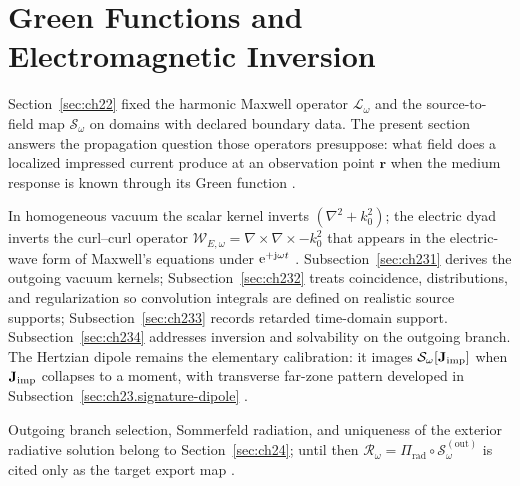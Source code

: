 \section{Green Functions and Electromagnetic Inversion}
\label{sec:ch23}

Section~\ref{sec:ch22} fixed the harmonic Maxwell operator $\mathcal{L}_\omega$ and the source-to-field map $\mathcal{S}_\omega$ on domains with declared boundary data. The present section answers the propagation question those operators presuppose: what field does a localized impressed current produce at an observation point $\mathbf{r}$ when the medium response is known through its Green function \cite{stratton1941}.

In homogeneous vacuum the scalar kernel inverts $(\nabla^{2}+k_0^{2})$; the electric dyad inverts the curl--curl operator $\mathcal{W}_{E,\omega}=\nabla\times\nabla\times-k_0^{2}$ that appears in the electric-wave form of Maxwell's equations under $\mathrm{e}^{+\mathrm{j}\omega t}$ \cite{jackson1999,tai1994}. Subsection~\ref{sec:ch231} derives the outgoing vacuum kernels; Subsection~\ref{sec:ch232} treats coincidence, distributions, and regularization so convolution integrals are defined on realistic source supports; Subsection~\ref{sec:ch233} records retarded time-domain support. Subsection~\ref{sec:ch234} addresses inversion and solvability on the outgoing branch. The Hertzian dipole remains the elementary calibration: it images $\mathcal{S}_\omega[\mathbf{J}_{\mathrm{imp}}]$ when $\mathbf{J}_{\mathrm{imp}}$ collapses to a moment, with transverse far-zone pattern developed in Subsection~\ref{sec:ch23.signature-dipole} \cite{jackson1999}.

Outgoing branch selection, Sommerfeld radiation, and uniqueness of the exterior radiative solution belong to Section~\ref{sec:ch24}; until then $\mathcal{R}_\omega=\Pi_{\mathrm{rad}}\circ\mathcal{S}_\omega^{(\mathrm{out})}$ is cited only as the target export map \cite{sommerfeld1949}.